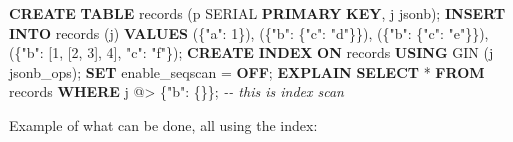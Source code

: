 \documentclass[
]{article}
\newenvironment{Shaded}{}{}
\newcommand{\CommentTok}[1]{\textcolor[rgb]{0.38,0.63,0.69}{\textit{#1}}}
\newcommand{\DataTypeTok}[1]{\textcolor[rgb]{0.56,0.13,0.00}{#1}}
\newcommand{\KeywordTok}[1]{\textcolor[rgb]{0.00,0.44,0.13}{\textbf{#1}}}
\newcommand{\NormalTok}[1]{#1}
\newcommand{\OperatorTok}[1]{\textcolor[rgb]{0.40,0.40,0.40}{#1}}
\newcommand{\StringTok}[1]{\textcolor[rgb]{0.25,0.44,0.63}{#1}}
\begin{document}
\begin{Shaded}
\begin{Highlighting}[]
\KeywordTok{CREATE} \KeywordTok{TABLE}\NormalTok{ records (p SERIAL }\KeywordTok{PRIMARY} \KeywordTok{KEY}\NormalTok{, j jsonb);}
\KeywordTok{INSERT} \KeywordTok{INTO}\NormalTok{ records (j) }\KeywordTok{VALUES}
\NormalTok{  (}\StringTok{\textquotesingle{}\{"a": 1\}\textquotesingle{}}\NormalTok{),}
\NormalTok{  (}\StringTok{\textquotesingle{}\{"b": \{"c": "d"\}\}\textquotesingle{}}\NormalTok{),}
\NormalTok{  (}\StringTok{\textquotesingle{}\{"b": \{"c": "e"\}\}\textquotesingle{}}\NormalTok{),}
\NormalTok{  (}\StringTok{\textquotesingle{}\{"b": [1, [2, 3], 4], "c": "f"\}\textquotesingle{}}\NormalTok{);}
\KeywordTok{CREATE} \KeywordTok{INDEX} \KeywordTok{ON}\NormalTok{ records }\KeywordTok{USING}\NormalTok{ GIN (j jsonb\_ops);}
\KeywordTok{SET}\NormalTok{ enable\_seqscan }\OperatorTok{=} \KeywordTok{OFF}\NormalTok{;}
\KeywordTok{EXPLAIN} \KeywordTok{SELECT} \OperatorTok{*} \KeywordTok{FROM}\NormalTok{ records }\KeywordTok{WHERE}\NormalTok{ j @}\OperatorTok{\textgreater{}} \StringTok{\textquotesingle{}\{"b": \{\}\}\textquotesingle{}}\NormalTok{; }\CommentTok{{-}{-} this is index scan}
\end{Highlighting}
\end{Shaded}

Example of what can be done, all using the index:

\begin{Shaded}
\end{Shaded}
\end{document}
